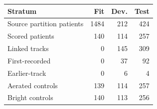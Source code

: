 \begin{tabular}{@{}lrrr@{}}
\toprule
Stratum & Fit & Dev. & Test \\
\midrule
Source partition patients & 1484 & 212 & 424 \\
Scored patients & 140 & 114 & 257 \\
Linked tracks & 0 & 145 & 309 \\
First-recorded & 0 & 37 & 92 \\
Earlier-track & 0 & 6 & 4 \\
Aerated controls & 139 & 114 & 257 \\
Bright controls & 140 & 113 & 256 \\
\bottomrule
\end{tabular}
